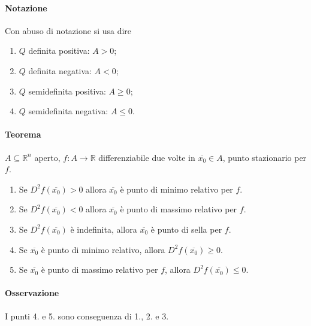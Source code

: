 \documentclass{article}
\newcommand{\R}{\mathbb{R}}
\begin{document}
\paragraph{Notazione}
Con abuso di notazione si usa dire
\begin{enumerate}
    \item $Q$ definita positiva: $A >0$; 
    \item $Q$ definita negativa: $A<0$;
    \item $Q$ semidefinita positiva: $A \geq 0$;
    \item $Q$ semidefinita negativa: $A \leq 0$.
\end{enumerate}

\paragraph{{Teorema}}
$A \subseteq \R^n$ aperto, $f:A \rightarrow  \R$ differenziabile due volte in $\overline{x_0}\in A$, punto stazionario per $f$.
\begin{enumerate}
    \item Se $D^2f(\overline{x_0})>0 $ allora $\overline{x_0}$ è punto di minimo relativo per $f$.
    \item Se $D^2f(\overline{x_0})<0$ allora $\overline{x_0}$ è punto di massimo relativo per $f$. 
    \item Se $D^2f(\overline{x_0})$ è indefinita, allora $\overline{x_0}$ è punto di sella per $f$.
    \item Se $\overline{x_0}$ è punto di minimo relativo, allora $D^2f(\overline{x_0})\geq0$.
    \item Se $\overline{x_0}$ è punto di massimo relativo per $f$, allora $D^2f(\overline{x_0})\leq0$.
\end{enumerate}

\paragraph{{Osservazione}}
I punti 4. e 5. sono conseguenza di 1., 2. e 3.
\end{document}
